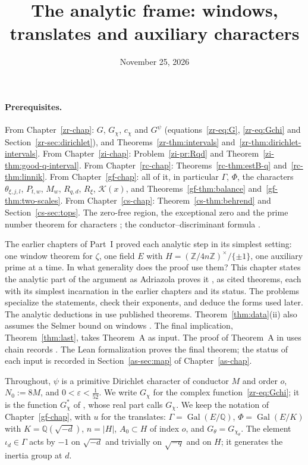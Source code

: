 \documentclass[reqno]{amsart}
\title{The analytic frame: windows, translates and auxiliary characters}
\author{}
\date{November 25, 2026}
\newcounter{chap}
\theoremstyle{definition}
\theoremstyle{plain}
\newcommand{\Z}{\mathbb{Z}}
\newcommand{\Q}{\mathbb{Q}}
\begin{document}
\maketitle
{}\label{chap}

\paragraph{Prerequisites.}
From Chapter~\ref{zr-chap}: \(G\), \(G_\chi\), \(c_\chi\) and \(G^\psi\) (equations~\eqref{zr-eq:G}, \eqref{zr-eq:Gchi} and Section~\ref{zr-sec:dirichlet}), and Theorems~\ref{zr-thm:intervals} and~\ref{zr-thm:dirichlet-intervals}.  From Chapter~\ref{zi-chap}: Problem~\ref{zi-pr:Rqd} and Theorem~\ref{zi-thm:good-q-interval}.  From Chapter~\ref{rc-chap}: Theorems~\ref{rc-thm:estB-q} and~\ref{rc-thm:linnik}.  From Chapter~\ref{gf-chap}: all of it, in particular \(\Gamma\), \(\Phi\), the characters \(\theta_{\xi,j,l}\), \(P_{t,w}\), \(M_w\), \(R_{q,d}\), \(R_\xi\), \(\mathcal{K}(x)\), and Theorems~\ref{gf-thm:balance} and~\ref{gf-thm:two-scales}.  From Chapter~\ref{cs-chap}: Theorem~\ref{cs-thm:behrend} and Section~\ref{cs-sec:tops}.  The zero-free region, the exceptional zero and the prime number theorem for characters \cite[Chs.~14 and~20]{Dav}; the conductor--discriminant formula \cite[Ch.~3]{Wa}. %

\medskip
The earlier chapters of Part~I proved each analytic step in its simplest setting: one window theorem for \(\zeta\), one field \(E\) with \(H = (\Z/4n\Z)^\times/\{\pm1\}\), one auxiliary prime at a time.  In what generality does the proof use them?  This chapter states the analytic part of the argument as Adriazola proves it \cite[\S\S2--6]{Adr}, as cited theorems, each with its simplest incarnation in the earlier chapters and its status.  The problems specialize the statements, check their exponents, and deduce the forms used later.  The analytic deductions in \cite{Adr} use published theorems.  Theorem~\ref{thm:data}(ii) also assumes the Selmer bound on windows \cite[Hyp.~17.11]{Adr}.  The final implication, Theorem~\ref{thm:last}, takes Theorem~A as input.  The proof of Theorem~A in \cite[\S18.6]{Adr} uses chain records \cite[Hyp.~18.10]{Adr}.  The Lean formalization \cite{Lean} proves the final theorem; the status of each input is recorded in Section~\ref{as-sec:map} of Chapter~\ref{as-chap}. %

Throughout, \(\psi\) is a primitive Dirichlet character of conductor \(M\) and order \(o\), \(N_0 := 8M\), and \(0 < \varepsilon < \frac1{52}\).  We write \(G_\chi\) for the complex function~\eqref{zr-eq:Gchi}; it is the function \(G^\ast_\chi\) of \cite[(5.1)]{Adr}, whose real part \cite{Adr} calls \(G_\chi\).  We keep the notation of Chapter~\ref{gf-chap}, with \(u\) for the translates: \(\Gamma = \operatorname{Gal}(E/\Q)\), \(\Phi = \operatorname{Gal}(E/K)\) with \(K = \Q(\sqrt{-d})\), \(n = \lvert H \rvert\), \(A_0 \subset H\) of index \(o\), and \(G_\theta = G_{\chi_\theta}\).  The element \(\iota_d \in \Gamma\) acts by \(-1\) on \(\sqrt{-d}\) and trivially on \(\sqrt{-q}\) and on \(H\); it generates the inertia group at \(d\).
\end{document}
